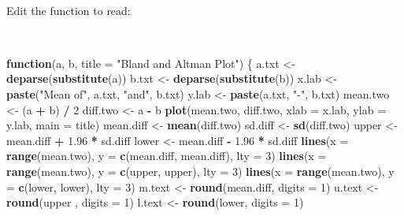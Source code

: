 \documentclass[12pt,a4paper]{book}
\newenvironment{Shaded}{\begin{snugshade}}{\end{snugshade}}
\newcommand{\ControlFlowTok}[1]{\textcolor[rgb]{0.13,0.29,0.53}{\textbf{#1}}}
\newcommand{\DataTypeTok}[1]{\textcolor[rgb]{0.13,0.29,0.53}{#1}}
\newcommand{\DecValTok}[1]{\textcolor[rgb]{0.00,0.00,0.81}{#1}}
\newcommand{\FloatTok}[1]{\textcolor[rgb]{0.00,0.00,0.81}{#1}}
\newcommand{\KeywordTok}[1]{\textcolor[rgb]{0.13,0.29,0.53}{\textbf{#1}}}
\newcommand{\NormalTok}[1]{#1}
\newcommand{\OperatorTok}[1]{\textcolor[rgb]{0.81,0.36,0.00}{\textbf{#1}}}
\newcommand{\StringTok}[1]{\textcolor[rgb]{0.31,0.60,0.02}{#1}}
\theoremstyle{definition}
\theoremstyle{definition}
\theoremstyle{definition}
\theoremstyle{remark}
\begin{document}
~

Edit the function to read:

~

\begin{Shaded}
\begin{Highlighting}[]
\ControlFlowTok{function}\NormalTok{(a, b, }\DataTypeTok{title =} \StringTok{"Bland and Altman Plot"}\NormalTok{) \{}
\NormalTok{  a.txt <-}\StringTok{ }\KeywordTok{deparse}\NormalTok{(}\KeywordTok{substitute}\NormalTok{(a))}
\NormalTok{  b.txt <-}\StringTok{ }\KeywordTok{deparse}\NormalTok{(}\KeywordTok{substitute}\NormalTok{(b))}
\NormalTok{  x.lab <-}\StringTok{ }\KeywordTok{paste}\NormalTok{(}\StringTok{"Mean of"}\NormalTok{, a.txt, }\StringTok{"and"}\NormalTok{, b.txt)}
\NormalTok{  y.lab <-}\StringTok{ }\KeywordTok{paste}\NormalTok{(a.txt, }\StringTok{"-"}\NormalTok{, b.txt)}
\NormalTok{  mean.two <-}\StringTok{ }\NormalTok{(a }\OperatorTok{+}\StringTok{ }\NormalTok{b) }\OperatorTok{/}\StringTok{ }\DecValTok{2}
\NormalTok{  diff.two <-}\StringTok{ }\NormalTok{a }\OperatorTok{-}\StringTok{ }\NormalTok{b}
  \KeywordTok{plot}\NormalTok{(mean.two, diff.two, }\DataTypeTok{xlab =}\NormalTok{ x.lab, }\DataTypeTok{ylab =}\NormalTok{ y.lab, }\DataTypeTok{main =}\NormalTok{ title) }
\NormalTok{  mean.diff <-}\StringTok{ }\KeywordTok{mean}\NormalTok{(diff.two)}
\NormalTok{  sd.diff <-}\StringTok{ }\KeywordTok{sd}\NormalTok{(diff.two)}
\NormalTok{  upper <-}\StringTok{ }\NormalTok{mean.diff }\OperatorTok{+}\StringTok{ }\FloatTok{1.96} \OperatorTok{*}\StringTok{ }\NormalTok{sd.diff}
\NormalTok{  lower <-}\StringTok{ }\NormalTok{mean.diff }\OperatorTok{-}\StringTok{ }\FloatTok{1.96} \OperatorTok{*}\StringTok{ }\NormalTok{sd.diff}
  \KeywordTok{lines}\NormalTok{(}\DataTypeTok{x =} \KeywordTok{range}\NormalTok{(mean.two), }\DataTypeTok{y =} \KeywordTok{c}\NormalTok{(mean.diff, mean.diff), }\DataTypeTok{lty =} \DecValTok{3}\NormalTok{) }
  \KeywordTok{lines}\NormalTok{(}\DataTypeTok{x =} \KeywordTok{range}\NormalTok{(mean.two), }\DataTypeTok{y =} \KeywordTok{c}\NormalTok{(upper, upper), }\DataTypeTok{lty =} \DecValTok{3}\NormalTok{)}
  \KeywordTok{lines}\NormalTok{(}\DataTypeTok{x =} \KeywordTok{range}\NormalTok{(mean.two), }\DataTypeTok{y =} \KeywordTok{c}\NormalTok{(lower, lower), }\DataTypeTok{lty =} \DecValTok{3}\NormalTok{)}
\NormalTok{  m.text <-}\StringTok{ }\KeywordTok{round}\NormalTok{(mean.diff, }\DataTypeTok{digits =} \DecValTok{1}\NormalTok{)}
\NormalTok{  u.text <-}\StringTok{ }\KeywordTok{round}\NormalTok{(upper , }\DataTypeTok{digits =} \DecValTok{1}\NormalTok{)}
\NormalTok{  l.text <-}\StringTok{ }\KeywordTok{round}\NormalTok{(lower, }\DataTypeTok{digits =} \DecValTok{1}\NormalTok{)}

\end{Highlighting}
\end{Shaded}
\end{document}
